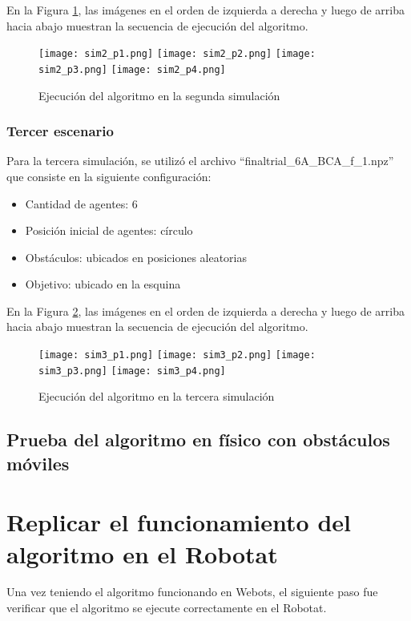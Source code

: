 En la Figura \ref{fig:segunda_simulacion}, las imágenes en el orden de izquierda a derecha y luego de arriba hacia abajo muestran la secuencia de ejecución del algoritmo.

\begin{figure}[H]
	\centering
	\texttt{[image: sim2\_p1.png]}
	\texttt{[image: sim2\_p2.png]}
	\texttt{[image: sim2\_p3.png]}
	\texttt{[image: sim2\_p4.png]}
	\caption{Ejecución del algoritmo en la segunda simulación}
	\label{fig:segunda_simulacion}
\end{figure}

\subsubsection{Tercer escenario}
Para la tercera simulación, se utilizó el archivo ``finaltrial\_6A\_BCA\_f\_1.npz'' que consiste en la siguiente configuración:
\begin{itemize}
	\item Cantidad de agentes: 6
	\item Posición inicial de agentes: círculo
	\item Obstáculos: ubicados en posiciones aleatorias
	\item Objetivo: ubicado en la esquina
\end{itemize}

En la Figura \ref{fig:tercera_simulacion}, las imágenes en el orden de izquierda a derecha y luego de arriba hacia abajo muestran la secuencia de ejecución del algoritmo.

\begin{figure}[H]
	\centering
	\texttt{[image: sim3\_p1.png]}
	\texttt{[image: sim3\_p2.png]}
	\texttt{[image: sim3\_p3.png]}
	\texttt{[image: sim3\_p4.png]}
	\caption{Ejecución del algoritmo en la tercera simulación}
	\label{fig:tercera_simulacion}
\end{figure}

\subsection{Prueba del algoritmo en físico con obstáculos móviles}



\section{Replicar el funcionamiento del algoritmo en el Robotat}
Una vez teniendo el algoritmo funcionando en Webots, el siguiente paso fue verificar que el algoritmo se ejecute correctamente en el Robotat.
